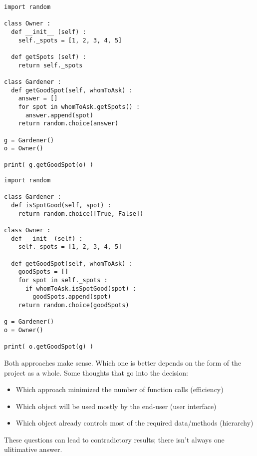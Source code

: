 \begin{frame}[fragile]
%
\begin{tcbraster}[raster columns=2,
                  raster equal height,
                  nobeforeafter,
                  raster column skip=0.5cm]
\begin{codebox}
\begin{verbatim}
import random

class Owner :
  def __init__ (self) :
    self._spots = [1, 2, 3, 4, 5]
  
  def getSpots (self) :
    return self._spots

class Gardener :
  def getGoodSpot(self, whomToAsk) :
    answer = []
    for spot in whomToAsk.getSpots() :
      answer.append(spot)
    return random.choice(answer)

g = Gardener()
o = Owner()

print( g.getGoodSpot(o) )
\end{verbatim}
\end{codebox}
%
\begin{codebox}
\begin{verbatim}
import random

class Gardener :
  def isSpotGood(self, spot) :
    return random.choice([True, False])

class Owner :
  def __init__(self) :
    self._spots = [1, 2, 3, 4, 5]
  
  def getGoodSpot(self, whomToAsk) :
    goodSpots = []
    for spot in self._spots :
      if whomToAsk.isSpotGood(spot) :
        goodSpots.append(spot)
    return random.choice(goodSpots)
    
g = Gardener()
o = Owner()

print( o.getGoodSpot(g) )
\end{verbatim}
\end{codebox}
\end{tcbraster}
%
\end{frame}


\begin{frame}
%
\begin{hintbox}
Both approaches make sense. Which one is better depends on the form of the project as a whole. Some thoughts that go into the decision:
\begin{itemize}
\item Which approach minimized the number of function calls (\thus efficiency)
\item Which object will be used mostly by the end-user (\thus user interface)
\item Which object already controls most of the required data/methods (\thus hierarchy)
\end{itemize}

These questions can lead to contradictory results; there isn't always one ulitimative answer.
\end{hintbox}
%
\end{frame}

